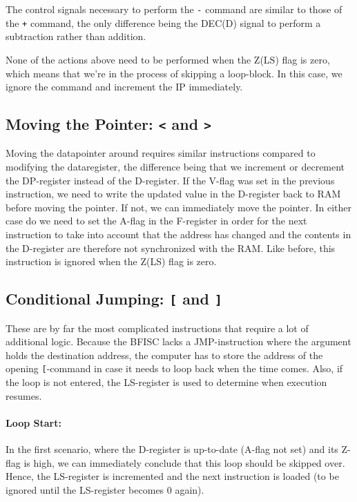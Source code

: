 The control signals necessary to perform the \texttt{-} command are similar to those of the \texttt{+} command, the only difference being the DEC(D) signal to perform a subtraction rather than addition.

None of the actions above need to be performed when the Z(LS) flag is zero, which means that we're in the process of skipping a loop-block. In this case, we ignore the command and increment the IP immediately.

\subsection{Moving the Pointer: \texttt{<} and \texttt{>}}
Moving the datapointer around requires similar instructions compared to modifying the dataregister, the difference being that we increment or decrement the DP-register instead of the D-register. If the V-flag was set in the previous instruction, we need to write the updated value in the D-register back to RAM before moving the pointer. If not, we can immediately move the pointer. In either case do we need to set the A-flag in the F-register in order for the next instruction to take into account that the address has changed and the contents in the D-register are therefore not synchronized with the RAM. Like before, this instruction is ignored when the Z(LS) flag is zero.

\subsection{Conditional Jumping: \texttt{[} and \texttt{]}}
These are by far the most complicated instructions that require a lot of additional logic. Because the BFISC lacks a JMP-instruction where the argument holds the destination address, the computer has to store the address of the opening \texttt{[}-command in case it needs to loop back when the time comes. Also, if the loop is not entered, the LS-register is used to determine when execution resumes.

\paragraph{Loop Start:}  
In the first scenario, where the D-register is up-to-date (A-flag not set) and its Z-flag is high, we can immediately conclude that this loop should be skipped over. Hence, the LS-register is incremented and the next instruction is loaded (to be ignored until the LS-register becomes 0 again).

